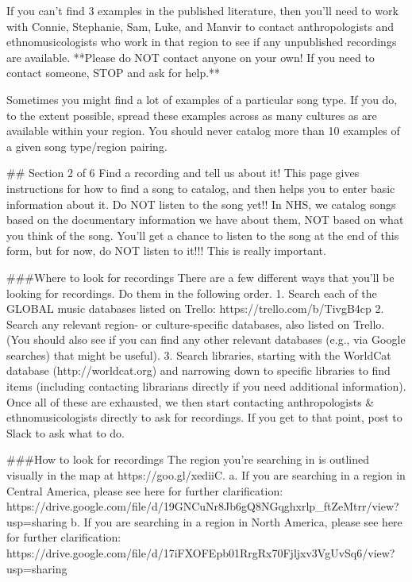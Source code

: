 If you can't find 3 examples in the published literature, then you'll need to work with Connie, Stephanie, Sam, Luke, and Manvir to contact anthropologists and ethnomusicologists who work in that region to see if any unpublished recordings are available. **Please do NOT contact anyone on your own! If you need to contact someone, STOP and ask for help.**

Sometimes you might find a lot of examples of a particular song type. If you do, to the extent possible, spread these examples across as many cultures as are available within your region. You should never catalog more than 10 examples of a given song type/region pairing.

## Section 2 of 6
Find a recording and tell us about it!
This page gives instructions for how to find a song to catalog, and then helps you to enter basic information about it.
Do NOT listen to the song yet!!
In NHS, we catalog songs based on the documentary information we have about them, NOT based on what you think of the song. You'll get a chance to listen to the song at the end of this form, but for now, do NOT listen to it!!! This is really important.

###Where to look for recordings
There are a few different ways that you'll be looking for recordings. Do them in the following order.
1. Search each of the GLOBAL music databases listed on Trello: https://trello.com/b/TivgB4cp
2. Search any relevant region- or culture-specific databases, also listed on Trello. (You should also see if you can find any other relevant databases (e.g., via Google searches) that might be useful).
3. Search libraries, starting with the WorldCat database (http://worldcat.org) and narrowing down to specific libraries to find items (including contacting librarians directly if you need additional information).
Once all of these are exhausted, we then start contacting anthropologists & ethnomusicologists directly to ask for recordings. If you get to that point, post to Slack to ask what to do.

###How to look for recordings
The region you're searching in is outlined visually in the map at https://goo.gl/xediiC.
a. If you are searching in a region in Central America, please see here for further clarification: https://drive.google.com/file/d/19GNCuNr8Jb6gQ8NGqghxrlp_ftZeMtrr/view?usp=sharing
b. If you are searching in a region in North America, please see here for further clarification: https://drive.google.com/file/d/17iFXOFEpb01RrgRx70Fjljxv3VgUvSq6/view?usp=sharing

